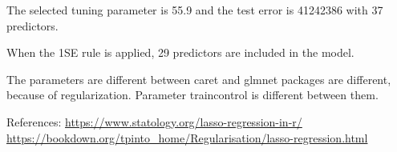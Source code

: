 \documentclass[
]{article}
\begin{document}
The selected tuning parameter is 55.9 and the test error is 41242386
with 37 predictors.

When the 1SE rule is applied, 29 predictors are included in the model.

The parameters are different between caret and glmnet packages are
different, because of regularization. Parameter traincontrol is
different between them.

References: \url{https://www.statology.org/lasso-regression-in-r/}
\url{https://bookdown.org/tpinto_home/Regularisation/lasso-regression.html}
\end{document}
